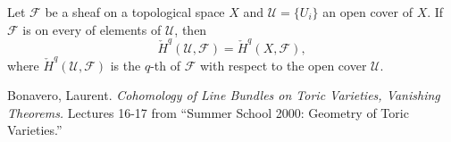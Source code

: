 \documentclass[12pt]{article}
\begin{document}
Let $\mathcal F$ be a sheaf on a topological space $X$ and $\mathcal U=\{U_i\}$ an open cover of $X$. If $\mathcal F$ is  on every   of elements of $\mathcal U$, then
$$
\check H^q(\mathcal U,\mathcal F)=\check H^q(X,\mathcal F),
$$
where $\check H^q(\mathcal U,\mathcal F)$ is the $q$-th  of $\mathcal F$ with respect to the open cover $\mathcal U$.

\begin{thebibliography}{9}
 Bonavero, Laurent.  \emph{Cohomology of Line Bundles on Toric Varieties, Vanishing Theorems.}  Lectures 16-17 from ``Summer School 2000:  Geometry of Toric Varieties.''
\end{thebibliography}
\end{document}
